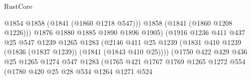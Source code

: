 \begin{lexlean}{RustCore}
\begin{coremodule}
                                            @1854
                                            @1858
                                            (@1841 (@1860 @1218 @547)))
                                          @1858
                                          (@1841 (@1860 @1208 @1226)))
                                        @1876
                                        @1880
                                        @1885
                                        @1890
                                        @1896
                                        @1905)
                                      (@1916
                                        @1236
                                        @411
                                        @437
                                        @25
                                        @547
                                        @1239
                                        @1265
                                        @1283
                                        (@2146
                                          @411
                                          @25
                                          @1239
                                          (@1831
                                            @410
                                            @1239
                                            (@1836 (@1837 @1239))
                                            (@1841 (@1843 @410 @25))))
                                        (@1750
                                          @422
                                          @429
                                          @436
                                          @25
                                          @1265
                                          @1274
                                          @547
                                          @1283
                                          (@1765
                                            @421
                                            @1767
                                            @1769
                                            @1265
                                            @1272
                                            @554
                                            (@1780
                                              @420
                                              @25
                                              @28
                                              @534
                                              @1264
                                              @1271
                                              @524

\end{coremodule}
\end{lexlean}

